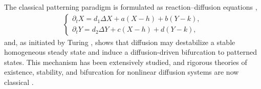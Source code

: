 \documentclass[pdflatex,sn-mathphys-ay]{sn-jnl}
\theoremstyle{thmstyleone}
\theoremstyle{definition}
\theoremstyle{remark}
\begin{document}
The classical patterning paradigm is formulated as reaction--diffusion equations \citep{cherniha2017nonlinear,kondo2010reaction},
\begin{align*}
    \begin{cases}
    \partial_{t}X = d_{1}\Delta X + a(X-h)+b(Y-k), \\ 
    \partial_{t}Y = d_{2}\Delta Y + c(X-h)+d(Y-k),
    \end{cases}
\end{align*}
and, as initiated by Turing \citep{turing1952chemical}, shows that diffusion may destabilize a stable homogeneous steady state and induce a diffusion-driven bifurcation to patterned states. 
This mechanism has been extensively studied, and rigorous theories of existence, stability, and bifurcation for nonlinear diffusion systems are now classical \citep{chen2019non,wang2026breakdown,henry2006geometric,smoller2012shock}. 
\end{document}
